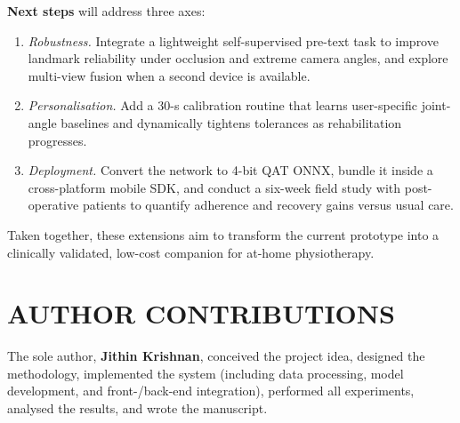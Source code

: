 \documentclass{article}
\begin{document}
\textbf{Next steps} will address three axes:
\begin{enumerate}[label=\arabic*.,leftmargin=1.35em,itemsep=3pt]
  \item \emph{Robustness.}  Integrate a lightweight self-supervised
        pre-text task to improve landmark reliability under occlusion
        and extreme camera angles, and explore multi-view fusion when a
        second device is available.
  \item \emph{Personalisation.}  Add a 30-s calibration routine that
        learns user-specific joint-angle baselines and dynamically
        tightens tolerances as rehabilitation progresses.
  \item \emph{Deployment.}  Convert the network to 4-bit QAT ONNX,
        bundle it inside a cross-platform mobile SDK, and conduct a
        six-week field study with post-operative patients to quantify
        adherence and recovery gains versus usual care.
\end{enumerate}

Taken together, these extensions aim to transform the current prototype
into a clinically validated, low-cost companion for at-home
physiotherapy.


\section{AUTHOR CONTRIBUTIONS}
The sole author, \textbf{Jithin Krishnan}, conceived the project idea, designed the methodology, implemented the system (including data processing, model development, and front-/back-end integration), performed all experiments, analysed the results, and wrote the manuscript.



\end{document}
